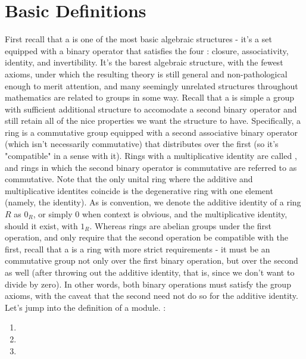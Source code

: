\documentclass{article}
\begin{document}
\section{Basic Definitions}
First recall that a  is one of the most basic algebraic structures - it's a set equipped with a binary operator that satisfies the four : closure, associativity, identity, and invertibility. It's the barest algebraic structure, with the fewest axioms, under which the resulting theory is still general and non-pathological enough to merit attention, and many seemingly unrelated structures throughout mathematics are related to groups in some way.
\n
Recall that a  is simple a group with sufficient additional structure to accomodate a second binary operator and still retain all of the nice properties we want the structure to have. Specifically, a ring is a commutative group equipped with a second associative binary operator (which isn't necessarily commutative) that distributes over the first (so it's "compatible" in a sense with it). Rings with a multiplicative identity are called , and rings in which the second binary operator is commutative are referred to as commutative. Note that the only unital ring where the additive and multiplicative identites coincide is the degenerative ring with one element (namely, the identity). As is convention, we denote the additive identity of a ring $ R $ as $ 0_R $, or simply $ 0 $ when context is obvious, and the multiplicative identity, should it exist, with $ 1_R $.
\n
Whereas rings are abelian groups under the first operation, and only require that the second operation be compatible with the first, recall that a  is a ring with more strict requirements - it must be an commutative group not only over the first binary operation, but over the second as well (after throwing out the additive identity, that is, since we don't want to divide by zero). In other words, both binary operations must satisfy the group axioms, with the caveat that the second need not do so for the additive identity.
\nn
Let's jump into the definition of a module.
\nn
{}: 
\begin{enumerate}
    \item {}
    \item {}
    \item {}
\end{enumerate}
\end{document}
